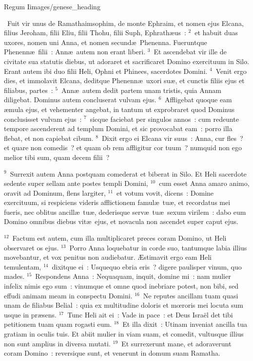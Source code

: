 {Regum I}{images/genese_heading}

~\lettrine[lines=10,image=true,loversize=0.05,lraise=-0.03]{F}{}uit vir unus de Ramathaimsophim, de monte Ephraim, et nomen ejus Elcana, filius Jeroham, filii Eliu, filii Thohu, filii Suph, Ephrath\ae us~:
${}^{2}$~et habuit duas uxores, nomen uni Anna, et nomen secund\ae\ Phenenna. Fueruntque Phenenn\ae\ filii~: Ann\ae\ autem non erant liberi.
${}^{3}$~Et ascendebat vir ille de civitate sua statutis diebus, ut adoraret et sacrificaret Domino exercituum in Silo. Erant autem ibi duo filii Heli, Ophni et Phinees, sacerdotes Domini.
${}^{4}$~Venit ergo dies, et immolavit Elcana, deditque Phenenn\ae\ uxori su\ae , et cunctis filiis ejus et filiabus, partes~:
${}^{5}$~Ann\ae\ autem dedit partem unam tristis, quia Annam diligebat. Dominus autem concluserat vulvam ejus.
${}^{6}$~Affligebat quoque eam \ae mula ejus, et vehementer angebat, in tantum ut exprobraret quod Dominus conclusisset vulvam ejus~:
${}^{7}$~sicque faciebat per singulos annos~: cum redeunte tempore ascenderent ad templum Domini, et sic provocabat eam~: porro illa flebat, et non capiebat cibum.
${}^{8}$~Dixit ergo ei Elcana vir suus~: Anna, cur fles~? et quare non comedis~? et quam ob rem affligitur cor tuum~? numquid non ego melior tibi sum, quam decem filii~?


${}^{9}$~Surrexit autem Anna postquam comederat et biberat in Silo. Et Heli sacerdote sedente super sellam ante postes templi Domini,
${}^{10}$~cum esset Anna amaro animo, oravit ad Dominum, flens largiter,
${}^{11}$~et votum vovit, dicens~: Domine exercituum, si respiciens videris afflictionem famul\ae\ tu\ae , et recordatus mei fueris, nec oblitus ancill\ae\ tu\ae , dederisque serv\ae\ tu\ae\ sexum virilem~: dabo eum Domino omnibus diebus vit\ae\ ejus, et novacula non ascendet super caput ejus.


${}^{12}$~Factum est autem, cum illa multiplicaret preces coram Domino, ut Heli observaret os ejus.
${}^{13}$~Porro Anna loquebatur in corde suo, tantumque labia illius movebantur, et vox penitus non audiebatur. \AE stimavit ergo eam Heli temulentam,
${}^{14}$~dixitque ei~: Usquequo ebria eris~? digere paulisper vinum, quo mades.
${}^{15}$~Respondens Anna~: Nequaquam, inquit, domine mi~: nam mulier infelix nimis ego sum~: vinumque et omne quod inebriare potest, non bibi, sed effudi animam meam in conspectu Domini.
${}^{16}$~Ne reputes ancillam tuam quasi unam de filiabus Belial~: quia ex multitudine doloris et mœroris mei locuta sum usque in pr\ae sens.
${}^{17}$~Tunc Heli ait ei~: Vade in pace~: et Deus Isra\"el det tibi petitionem tuam quam rogasti eum.
${}^{18}$~Et illa dixit~: Utinam inveniat ancilla tua gratiam in oculis tuis. Et abiit mulier in viam suam, et comedit, vultusque illius non sunt amplius in diversa mutati.
${}^{19}$~Et surrexerunt mane, et adoraverunt coram Domino~: reversique sunt, et venerunt in domum suam Ramatha.

